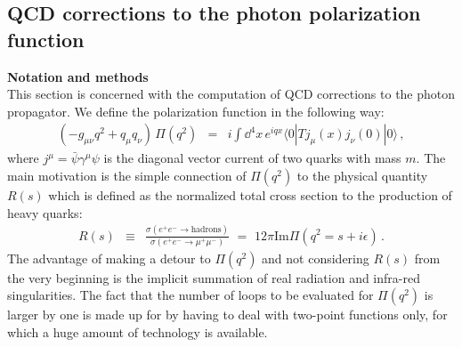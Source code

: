 %
\subsection{QCD corrections to the photon polarization
  function\label{sec::polfunc}}
%
\vspace{2ex}
{\bf Notation and methods}\\[2ex]
%
This section is concerned with the computation of QCD corrections
to the photon propagator. We define the polarization function in the
following way:
\begin{eqnarray}
\left(-g_{\mu\nu}q^2+q_\mu q_\nu\right)\,\Pi(q^2)
&=&i\int \dd^4 x\,e^{iqx}\langle 0 |Tj_\mu(x) j_\nu(0)|0 \rangle
\,,
\end{eqnarray}
where $j^\mu=\bar{\psi}\gamma^\mu\psi$ is the diagonal vector current of
two quarks with mass $m$.  The main motivation is the simple connection
of $\Pi(q^2)$ to the physical quantity $R(s)$ which is defined as the
normalized total cross section to the production of heavy quarks:
\begin{eqnarray}
R(s)&\equiv&\frac{\sigma\left(e^+e^-\to\mbox{hadrons}\right)}
            {\sigma\left(e^+e^-\to\mu^+\mu^-\right)}
    \,\,=\,\,12\pi\mbox{Im}\Pi(q^2=s+i\epsilon)
\,.
\end{eqnarray}
The advantage of making a detour to $\Pi(q^2)$ and not considering
$R(s)$ from the very beginning is the implicit summation of real
radiation and infra-red singularities. The fact that the number of loops
to be evaluated for $\Pi(q^2)$ is larger by one is made up for by having
to deal with two-point functions only, for which a huge amount of
technology is available.

